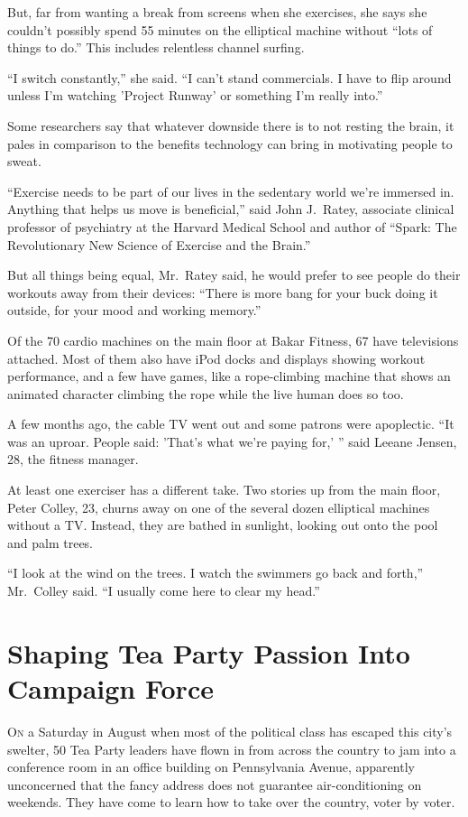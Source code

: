 ﻿\documentclass[12pt]{article}
\begin{document}
But, far from wanting a break from screens when she exercises, she says she couldn't possibly spend
55 minutes on the elliptical machine without ``lots of things to do.'' This includes relentless
channel surfing.

``I switch constantly,'' she said. ``I can't stand commercials. I have to flip around unless I'm
watching 'Project Runway' or something I'm really into.''

Some researchers say that whatever downside there is to not resting the brain, it pales in
comparison to the benefits technology can bring in motivating people to sweat.

``Exercise needs to be part of our lives in the sedentary world we're immersed in. Anything that
helps us move is beneficial,'' said John J.~Ratey, associate clinical professor of psychiatry at the
Harvard Medical School and author of ``Spark: The Revolutionary New Science of Exercise and the
Brain.''

But all things being equal, Mr.~Ratey said, he would prefer to see people do their workouts away
from their devices: ``There is more bang for your buck doing it outside, for your mood and working
memory.''

Of the 70 cardio machines on the main floor at Bakar Fitness, 67 have televisions attached. Most of
them also have iPod docks and displays showing workout performance, and a few have games, like a
rope-climbing machine that shows an animated character climbing the rope while the live human does
so too.

A few months ago, the cable TV went out and some patrons were apoplectic. ``It was an uproar. People
said: 'That's what we're paying for,' '' said Leeane Jensen, 28, the fitness manager.

At least one exerciser has a different take. Two stories up from the main floor, Peter Colley, 23,
churns away on one of the several dozen elliptical machines without a TV. Instead, they are bathed
in sunlight, looking out onto the pool and palm trees.

``I look at the wind on the trees. I watch the swimmers go back and forth,'' Mr.~Colley said. ``I
usually come here to clear my head.''

\pagebreak
\section{Shaping Tea Party Passion Into Campaign Force}

\lettrine{O}{n} a Saturday in August when most of the political class has
escaped this city's swelter, 50 Tea Party leaders have flown in from across the country to jam into
a conference room in an office building on Pennsylvania Avenue, apparently unconcerned that the
fancy address does not guarantee air-conditioning on weekends. They have come to learn how to take
over the country, voter by voter.
\end{document}
